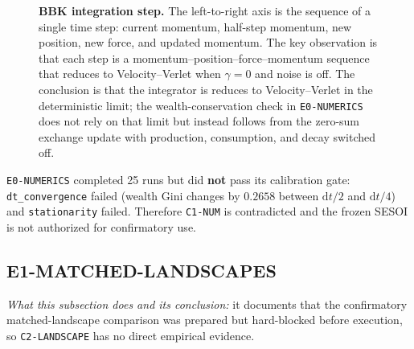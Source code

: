 \documentclass[11pt,a4paper]{article}
\newcommand{\code}[1]{\texttt{#1}}
\begin{document}
\begin{figure}[htbp]
\centering
{}
\caption{\textbf{BBK integration step.} The left-to-right axis is the sequence
of a single time step: current momentum, half-step momentum, new position, new
force, and updated momentum. The key observation is that each step is a
momentum--position--force--momentum sequence that reduces to Velocity--Verlet
when $\gamma=0$ and noise is off. The conclusion is that the integrator is
reduces to Velocity--Verlet in the deterministic limit; the wealth-conservation
check in \code{E0-NUMERICS} does not rely on that limit but instead follows
from the zero-sum exchange update with production, consumption, and decay
switched off.}
\label{fig:bbk}
\end{figure}

\begin{keybox}
\code{E0-NUMERICS} completed 25 runs but did \textbf{not} pass its calibration
gate: \code{dt\_convergence} failed (wealth Gini changes by $0.2658$ between
$\mathrm{d}t/2$ and $\mathrm{d}t/4$) and \code{stationarity} failed. Therefore
\code{C1-NUM} is contradicted and the frozen SESOI is not authorized for
confirmatory use.
\end{keybox}

\subsection{E1-MATCHED-LANDSCAPES}
\label{sec:e1}

\emph{What this subsection does and its conclusion:} it documents that the
confirmatory matched-landscape comparison was prepared but hard-blocked before
execution, so \code{C2-LANDSCAPE} has no direct empirical evidence.
\end{document}
